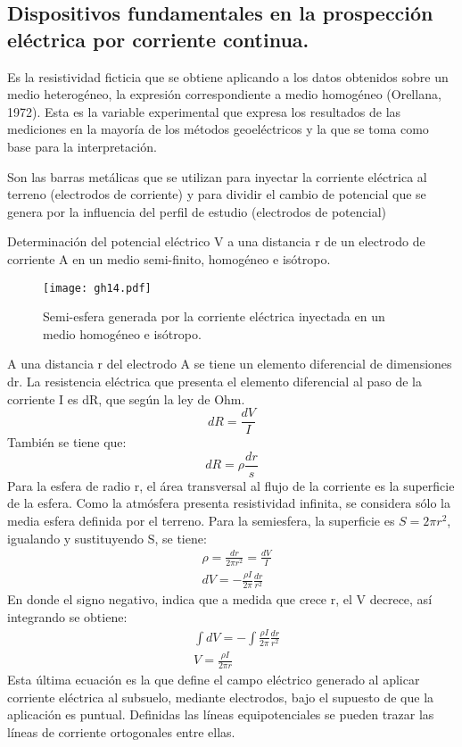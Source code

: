\subsection{Dispositivos fundamentales en la prospección eléctrica por corriente continua.}
\begin{definition}
    Es la resistividad ficticia que se obtiene aplicando a los datos obtenidos sobre un medio heterogéneo, la expresión correspondiente a medio homogéneo (Orellana, 1972). Esta es la variable experimental que expresa los resultados  de las mediciones en la mayoría de los métodos geoeléctricos y la que se toma como base para la interpretación.
\end{definition}
\begin{definition}[Electródos]
    Son las barras metálicas que se utilizan para inyectar la corriente eléctrica al terreno (electrodos de corriente) y para dividir el cambio de potencial que se genera por la influencia del perfil de estudio (electrodos de potencial)
\end{definition}
Determinación del potencial eléctrico V a una distancia r de un electrodo de corriente A en un medio semi-finito, homogéneo e isótropo.
\begin{figure}[h!]
\centering
  \texttt{[image: gh14.pdf]}
  \caption{Semi-esfera generada por la corriente eléctrica inyectada en un medio homogéneo e isótropo.}
  \label{gh14}
\end{figure}
A una distancia r del electrodo A se tiene un elemento diferencial de dimensiones dr. La resistencia eléctrica que presenta el elemento diferencial al paso de la corriente I es dR, que según la ley de Ohm.
\begin{equation}
    dR = \frac{dV}{I}
\end{equation}
También se tiene que:
\begin{equation}
    dR = \rho \frac{dr}{s}
\end{equation}
Para la esfera de radio r, el área transversal al flujo de la corriente es la superficie de la esfera. Como la atmósfera presenta resistividad infinita, se considera sólo la media esfera definida por el terreno. Para la semiesfera, la superficie es $S=2\pi r^2$, igualando y sustituyendo S, se tiene:
\begin{align*}
    &\rho = \frac{dr}{2\pi r^2} = \frac{dV}{I}\\
    &dV = - \frac{\rho I}{2\pi }\frac{dr}{r^2}
\end{align*}
En donde el signo negativo, indica que a medida que crece r, el V decrece, así integrando se obtiene:
\begin{align*}
    &\int dV = -\int \frac{\rho I}{2\pi}\frac{dr}{r^2}\\
    &V =\frac{\rho I}{2\pi r}
\end{align*}
Esta última ecuación es la que define el campo eléctrico generado al aplicar corriente eléctrica al subsuelo, mediante electrodos, bajo el supuesto de que la aplicación es puntual. Definidas las líneas equipotenciales se pueden trazar las líneas de corriente ortogonales entre ellas.

